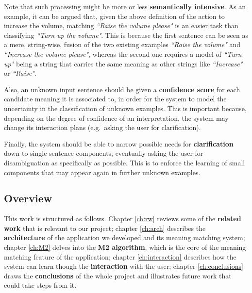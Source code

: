 Note that such processing might be more or less \textbf{semantically intensive}. As an example, it can be argued that, given the above definition of the action to increase the volume, matching \textit{``Raise the volume please"} is an easier task than classifying \textit{``Turn up the volume"}. This is because the first sentence can be seen as a mere, string-wise, fusion of the two existing examples \textit{``Raise the volume"} and \textit{``Increase the volume please"}, whereas the second one requires a model of \textit{``Turn up"} being a string that carries the same meaning as other strings like \textit{``Increase"} or \textit{``Raise"}.

Also, an unknown input sentence should be given a \textbf{confidence score} for each candidate meaning it is associated to, in order for the system to model the uncertainty in the classification of unknown examples. This is important because, depending on the degree of confidence of an interpretation, the system may change its interaction plans (e.g.\ asking the user for clarification).

Finally, the system should be able to narrow possible needs for \textbf{clarification} down to single sentence components, eventually asking the user for disambiguation as specifically as possible. This is to enforce the learning of small components that may appear again in further unknown examples.

\subsection{Overview}

This work is structured as follows. Chapter \ref{ch:rw} reviews some of the \textbf{related work} that is relevant to our project; chapter \ref{ch:arch} describes the \textbf{architecture} of the application we developed and its meaning matching system; chapter \ref{ch:M2} delves into the \textbf{M2 algorithm}, which is the core of the meaning matching feature of the application; chapter \ref{ch:interaction} describes how the system can learn though the \textbf{interaction} with the user; chapter \ref{ch:conclusions} draws the \textbf{conclusions} of the whole project and illustrates future work that could take steps from it.

